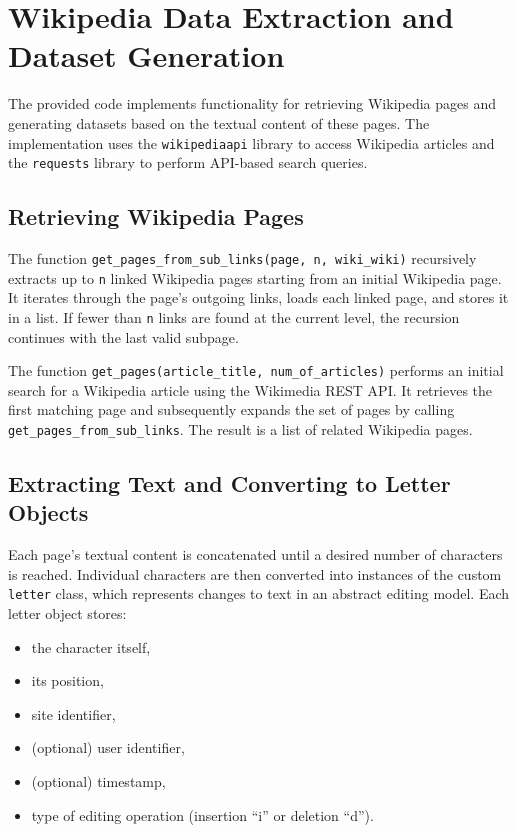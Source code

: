 \section{Wikipedia Data Extraction and Dataset Generation}

The provided code implements functionality for retrieving Wikipedia pages and generating datasets based on the textual content of these pages. The implementation uses the \texttt{wikipediaapi} library to access Wikipedia articles and the \texttt{requests} library to perform API-based search queries.

\subsection{Retrieving Wikipedia Pages}

The function \texttt{get\_pages\_from\_sub\_links(page, n, wiki\_wiki)} recursively extracts up to \texttt{n} linked Wikipedia pages starting from an initial Wikipedia page. It iterates through the page's outgoing links, loads each linked page, and stores it in a list. If fewer than \texttt{n} links are found at the current level, the recursion continues with the last valid subpage.

The function \texttt{get\_pages(article\_title, num\_of\_articles)} performs an initial search for a Wikipedia article using the Wikimedia REST API. It retrieves the first matching page and subsequently expands the set of pages by calling \texttt{get\_pages\_from\_sub\_links}. The result is a list of related Wikipedia pages.

\subsection{Extracting Text and Converting to Letter Objects}

Each page’s textual content is concatenated until a desired number of characters is reached. Individual characters are then converted into instances of the custom \texttt{letter} class, which represents changes to text in an abstract editing model. Each letter object stores:
\begin{itemize}
    \item the character itself,
    \item its position,
    \item site identifier,
    \item (optional) user identifier,
    \item (optional) timestamp,
    \item type of editing operation (insertion ``i'' or deletion ``d'').
\end{itemize}

